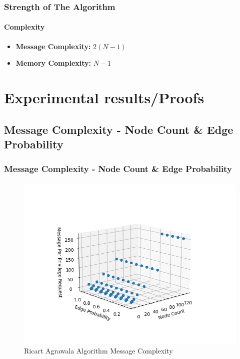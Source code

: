 \documentclass[11pt]{beamer}              %
\begin{document}
\begin{frame}
\frametitle{Strength of The Algorithm}
\framesubtitle{Complexity}
\begin{itemize}
    \item \textbf{Message Complexity:} $2(N-1)$
    \item \textbf{Memory Complexity:} $N-1$
\end{itemize}
\end{frame}

\section{Experimental results/Proofs}

\subsection{Message Complexity - Node Count \& Edge Probability}
\begin{frame}
\frametitle{Message Complexity - Node Count \& Edge Probability}
\framesubtitle{}
\begin{figure}
    \centering
    \includegraphics[scale=0.5]{figures/RicartAgrawalaAlgorithmMessageComplexity.png}
    \caption{Ricart Agrawala Algorithm Message Complexity}
    \label{fig:ricart_agrawala_algoritm_message_complexity}
\end{figure}
\end{frame}
\end{document}
